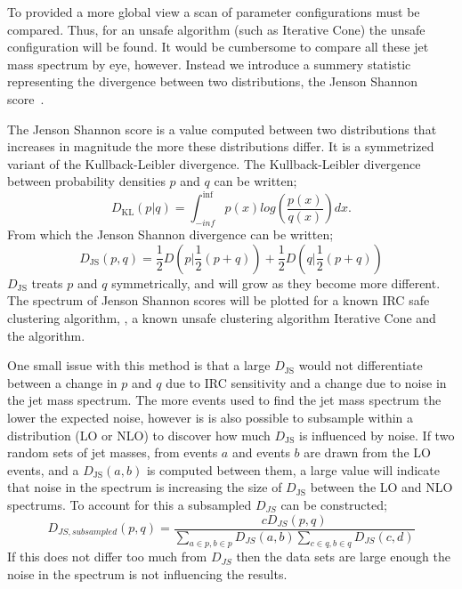    To provided a more global view a scan of parameter configurations must be compared.
    Thus, for an unsafe algorithm (such as Iterative Cone) the unsafe configuration
    will be found.
    It would be cumbersome to compare all these jet mass spectrum by eye, however.
    Instead we introduce a summery statistic representing the divergence between two distributions,
    the Jenson Shannon score~\cite{jensen_shannon}.

    The Jenson Shannon score is a value computed between two distributions that increases in magnitude the more these distributions differ.
    It is a symmetrized variant of the Kullback-Leibler divergence.
    The Kullback-Leibler divergence between probability densities \(p\) and \(q\) can be written;
    \begin{equation}
    D_\text{KL} (p | q) = \int^{\inf}_{-inf} p(x) log\left(\frac{p(x)}{q(x)}\right) dx.
\end{equation}
    From which the Jenson Shannon divergence can be written;
    \begin{equation}
    D_\text{JS}(p, q) = \frac{1}{2}D\left(p | \frac{1}{2}(p + q)\right) + \frac{1}{2}D\left(q | \frac{1}{2}(p + q)\right)
\end{equation}
    \(D_\text{JS}\) treats \(p\) and \(q\) symmetrically, and will grow as they become more different.
    The spectrum of Jenson Shannon scores will be plotted for a known IRC safe clustering algorithm, \antikt{},
    a known unsafe clustering algorithm Iterative Cone and the \spectral{} algorithm.

    One small issue with this method is that a large \(D_\text{JS}\) would not differentiate
    between a change in \(p\) and \(q\) due to IRC sensitivity and 
    a change due to noise in the jet mass spectrum.
    The more events used to find the jet mass spectrum the lower the expected noise,
    however is is also possible to subsample within a distribution (LO or NLO)
    to discover how much \(D_\text{JS}\) is influenced by noise.
    If two random sets of jet masses, from events \(a\) and events \(b\) are drawn from the LO events,
    and a \(D_\text{JS}(a, b)\) is computed between them, a large value will indicate that 
    noise in the spectrum is increasing the size of \(D_\text{JS}\) between the LO and NLO spectrums.
    To account for this a subsampled \(D_{JS}\) can be constructed;
    \begin{equation}
    D_{JS, subsampled}(p, q) = \frac{cD_{JS}(p, q)}{\sum_{a \in p, b \in p} D_{JS}(a, b)\sum_{c \in q, b \in q} D_{JS}(c, d)}
\end{equation}
    If this does not differ too much from \(D_{JS}\) then the data sets are large enough the noise in
    the spectrum is not influencing the results.
